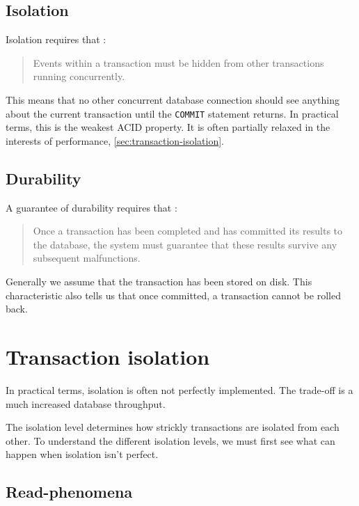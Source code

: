 \documentclass{pgnotes}
\begin{document}
\subsection{Isolation} 
\label{sec:isolation}

Isolation requires that \citep{haerder:1983:principles}:
\begin{quotation}
  Events within a transaction must be hidden from other transactions running concurrently.
\end{quotation}
This means that no other concurrent database connection should see anything about the current transaction until the \texttt{COMMIT} statement returns.
In practical terms, this is the weakest ACID property.
It is often partially relaxed in the interests of performance, \autoref{sec:transaction-isolation}.

\subsection{Durability} 
\label{sec:durability}

A guarantee of durability requires that \citep{haerder:1983:principles}:
\begin{quotation}
Once a transaction has been completed and has committed its results to the database, the system must guarantee that these results survive any subsequent malfunctions.
\end{quotation}
Generally we assume that the transaction has been stored on disk. 
This characteristic also tells us that once committed, a transaction cannot be rolled back.



\section{Transaction isolation}
\label{sec:transaction-isolation}

In practical terms, isolation is often not perfectly implemented.
The trade-off is a much increased database throughput.

The isolation level determines how strickly transactions are isolated from each other.
To understand the different isolation levels, we must first see what can happen when isolation isn't perfect.

\subsection{Read-phenomena}
\end{document}
